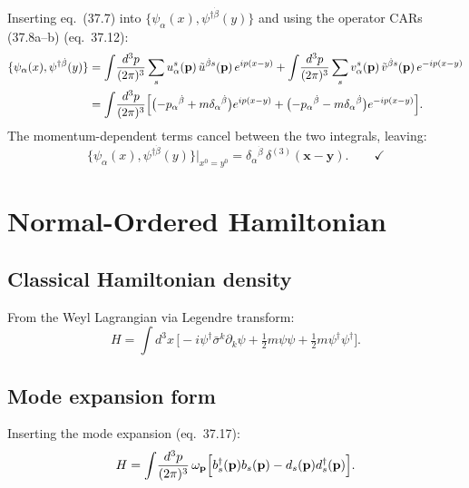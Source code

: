 Inserting eq.~(37.7) into $\{\psi_\alpha(x),\psi^{\dagger\dot\beta}(y)\}$ and
using the operator CARs (37.8a--b) (eq.~37.12):
\begin{align}
  \{\psi_\alpha(x),\psi^{\dagger\dot\beta}(y)\}
  &= \int\!\frac{d^3p}{(2\pi)^3}\sum_s u^s_\alpha(\mathbf{p})\,
     \tilde u^{\dot\beta s}(\mathbf{p})\,e^{ip(x-y)}
   + \int\!\frac{d^3p}{(2\pi)^3}\sum_s v^s_\alpha(\mathbf{p})\,
     \tilde v^{\dot\beta s}(\mathbf{p})\,e^{-ip(x-y)}
  \nonumber\\
  &= \int\!\frac{d^3p}{(2\pi)^3}\Bigl[
     \bigl(-p_\alpha{}^{\dot\beta}+m\delta_\alpha{}^{\dot\beta}\bigr)e^{ip(x-y)}
    +\bigl(-p_\alpha{}^{\dot\beta}-m\delta_\alpha{}^{\dot\beta}\bigr)e^{-ip(x-y)}
     \Bigr].
\end{align}
The momentum-dependent terms cancel between the two integrals, leaving:
\begin{equation}
  \{\psi_\alpha(x),\psi^{\dagger\dot\beta}(y)\}\Big|_{x^0=y^0}
  = \delta_\alpha{}^{\dot\beta}\,\delta^{(3)}(\mathbf{x}-\mathbf{y}).
  \qquad\checkmark
\end{equation}

\section{Normal-Ordered Hamiltonian}

\subsection{Classical Hamiltonian density}

From the Weyl Lagrangian via Legendre transform:
\begin{equation}
  H = \int\!d^3x\,\bigl[-i\psi^\dagger\bar\sigma^k\partial_k\psi
      + \tfrac{1}{2}m\psi\psi + \tfrac{1}{2}m\psi^\dagger\psi^\dagger\bigr].
\end{equation}

\subsection{Mode expansion form}

Inserting the mode expansion (eq.~37.17):
\begin{equation}
  H = \int\!\frac{d^3p}{(2\pi)^3}\,\omega_{\mathbf{p}}
  \Bigl[b^\dagger_s(\mathbf{p})b_s(\mathbf{p}) - d_s(\mathbf{p})d^\dagger_s(\mathbf{p})\Bigr].
\end{equation}

